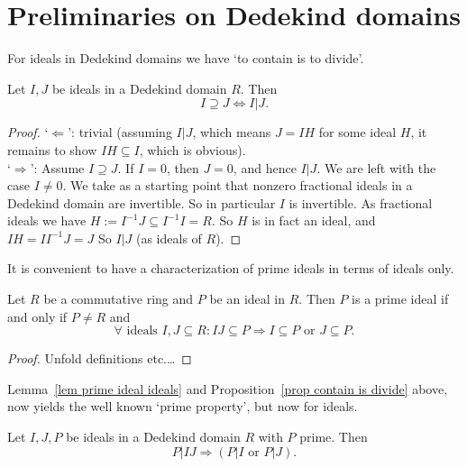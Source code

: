 \documentclass{amsart}
\begin{document}
\section{Preliminaries on Dedekind domains}

For ideals in Dedekind domains we have \lq to contain is to divide\rq. 
\begin{proposition}\label{prop contain is divide}
Let $I,J$ be ideals in a Dedekind domain $R$. Then
\begin{equation}\label{eqn contain is divide}
I \supseteq J \Leftrightarrow I|J.
\end{equation}
\end{proposition}

\begin{proof}
\lq $\Leftarrow$\rq: trivial (assuming $I|J$, which means $J=IH$ for some ideal $H$, it remains to show $IH \subseteq I$, which is obvious).\\
\lq $\Rightarrow$\rq: Assume $I \supseteq J$. If $I=0$, then $J=0$, and hence $I|J$. We are left with the case $I\not=0$.
We take as a starting point that nonzero fractional ideals in a Dedekind domain are invertible. So in particular $I$ is invertible. As fractional ideals we have $H:=I^{-1} J \subseteq I^{-1} I=R$. So $H$ is in fact an ideal, and $I H=I I^{-1} J=J$ So $I|J$ (as ideals of $R$).
\end{proof}

It is convenient to have a characterization of prime ideals in terms of ideals only.

\begin{lemma}\label{lem prime ideal ideals}
Let $R$ be a commutative ring and $P$ be an ideal in $R$. Then $P$ is a prime ideal if and only if $P\not=R$ and
\begin{equation}\label{eqn prime ideal ideals}
\forall \text{ ideals } I,J \subseteq R: IJ \subseteq P \Rightarrow I \subseteq P \text{ or } J \subseteq P.
\end{equation}
\end{lemma}

\begin{proof}
Unfold definitions etc.\ldots
\end{proof}

Lemma~\ref{lem prime ideal ideals} and Proposition~\ref{prop contain is divide} above, now yields the well known \lq prime property\rq, but now for ideals.

\begin{corollary}\label{cor prime property ideal}
Let $I,J,P$ be ideals in a Dedekind domain $R$ with $P$ prime. Then
\[ P|IJ \Rightarrow \left (P|I \text{ or } P|J \right).\]
\end{corollary}
\end{document}
